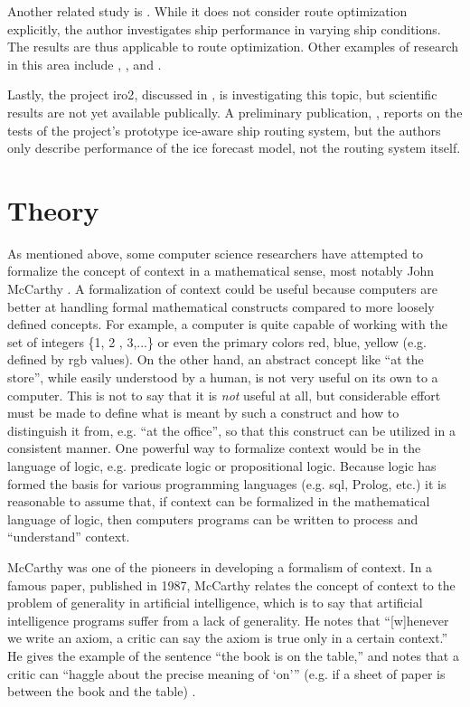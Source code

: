 Another related study is \cite{esa2015fuel}. While it does not consider route optimization explicitly, the author investigates ship performance in varying ship conditions. The results are thus applicable to route optimization. Other examples of research in this area include \cite{montewka2015towards}, \cite{laprairie1995transit}, and \cite{valanto2001resistance}.

Lastly, the project \gls{iro2}, discussed in \cite{fock2012}, is investigating this topic, but scientific results are not yet available publically. A preliminary publication, \cite{dobrynin2015prediction}, reports on the tests of the project's prototype ice-aware ship routing system, but the authors only describe performance of the ice forecast model, not the routing system itself.



\section{Theory}
\label{sec:theory}

As mentioned above, some computer science researchers have attempted to formalize the concept of context in a mathematical sense, most notably John McCarthy \cite{McCarthy1993} \cite{mccarthy1997formalizing}. A formalization of context could be useful because computers are better at handling formal mathematical constructs compared to more loosely defined concepts. For example, a computer is quite capable of working with the set of integers \{1, 2 , 3,...\} or even the primary colors {red, blue, yellow} (e.g. defined by \acrshort{rgb} values). On the other hand, an abstract concept like ``at the store'', while easily understood by a human, is not very useful on its own to a computer. This is not to say that it is \emph{not} useful at all, but considerable effort must be made to define what is meant by such a construct and how to distinguish it from, e.g. ``at the office'', so that this construct can be utilized in a consistent manner. One powerful way to formalize context would be in the language of logic, e.g. predicate logic or propositional logic. Because logic has formed the basis for various programming languages (e.g. \acrshort{sql}, Prolog, etc.) it is reasonable to assume that, if context can be formalized in the mathematical language of logic, then computers programs can be written to process and ``understand'' context.

McCarthy was one of the pioneers in developing a formalism of context. In a famous paper, published in 1987, McCarthy relates the concept of context to the problem of generality in artificial intelligence, which is to say that artificial intelligence programs suffer from a lack of generality. He notes that ``[w]henever we write an axiom, a critic can say the axiom is true only in a certain context.'' He gives the example of the sentence ``the book is on the table,'' and notes that a critic can ``haggle about the precise meaning of `on'\thinspace'' (e.g. if a sheet of paper is between the book and the table) \cite{mccarthy1987generality}. 

